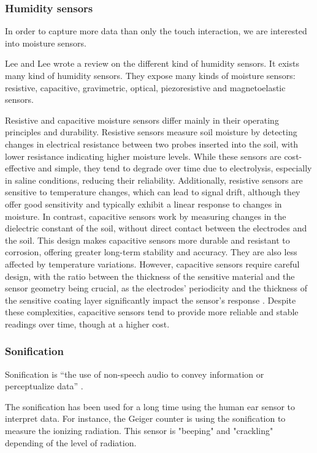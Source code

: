 \subsubsection{Humidity sensors}

In order to capture more data than only the touch interaction, we are interested into moisture sensors.

Lee and Lee \cite{leeHumiditySensorsReview2005} wrote a review on the different kind of humidity sensors. It exists many kind of humidity sensors. They expose many kinds of moisture sensors: resistive, capacitive, gravimetric, optical, piezoresistive and magnetoelastic sensors.

Resistive and capacitive moisture sensors differ mainly in their operating principles and durability. Resistive sensors measure soil moisture by detecting changes in electrical resistance between two probes inserted into the soil, with lower resistance indicating higher moisture levels. While these sensors are cost-effective and simple, they tend to degrade over time due to electrolysis, especially in saline conditions, reducing their reliability. Additionally, resistive sensors are sensitive to temperature changes, which can lead to signal drift, although they offer good sensitivity and typically exhibit a linear response to changes in moisture. In contrast, capacitive sensors work by measuring changes in the dielectric constant of the soil, without direct contact between the electrodes and the soil. This design makes capacitive sensors more durable and resistant to corrosion, offering greater long-term stability and accuracy. They are also less affected by temperature variations. However, capacitive sensors require careful design, with the ratio between the thickness of the sensitive material and the sensor geometry being crucial, as the electrodes' periodicity and the thickness of the sensitive coating layer significantly impact the sensor's response \cite{armankuzubasogluRecentStudiesHumidity2022}. Despite these complexities, capacitive sensors tend to provide more reliable and stable readings over time, though at a higher cost.


\subsubsection{Sonification}

Sonification is “the use of non-speech audio to convey information or perceptualize data” \cite{hermannListenYourData}.

The sonification has been used for a long time using the human ear sensor to interpret data. For instance, the Geiger counter is using the sonification to measure the ionizing radiation. This sensor is "beeping" and "crackling"
depending of the level of radiation.


